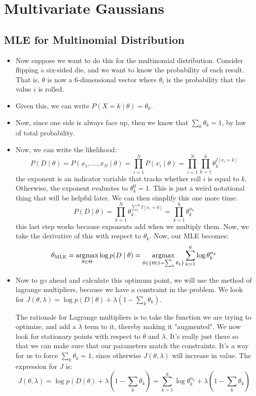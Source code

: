\section{Multivariate Gaussians}
\subsection{MLE for Multinomial Distribution}
\begin{itemize}
	\item Now suppose we want to do this for the multinomial distribution. Consider
		flipping a six-sided die, and we want to know the probability of each result.
		That is, \( \theta \) is now a 6-dimensional vector where \( \theta_i \) is
		the probability that the value \( i \) is rolled. 
	\item Given this, we can write \( P(X = k \mid \theta) = \theta_k \). 
	\item Now, since one side is always face up, then we know that \( \sum_k \theta_k
		= 1\), by law of total probability.  
	\item Now, we can write the likelihood:
		\[
			P(D \mid \theta) = P(x_1, \dots, x_N \mid \theta) = \prod_{i = 1}^{N}
			P(x_i \mid \theta) = \prod_{i = 1}^{N}\prod_{k = 1}^{6} \theta_k^{I[x_i =
			k]}
		\]
		the exponent is an indicator variable that tracks whether roll \( i \) is
		equal to \( k \). Otherwise, the exponent evaluates to \( \theta_k^{0} = 1
		\). This is just a weird notational thing that will be helpful later. We can
		then simplify this one more time:
		\[
			P(D \mid \theta) = \prod_{k = 1}^{N}\theta_k^{\sum_{i}^{N} I[x_i = k]} =
			\prod_{k = 1}^{6}\theta_k^{n_k}
		\]
		this last step works because exponents add when we multiply them. Now, we
		take the derivative of this with respect to \( \theta_k \). Now, our MLE
		becomes:
		\[
			\theta_\text{MLE} = \operatorname*{argmax}_{\theta \in \Theta} \log p(D \mid \theta) =
			\operatorname*{argmax}_{\theta \in \{\Theta \mid 1 = \sum_k \theta_k\}}\sum_{k =
			1}^{6}\log \theta_k^{n_k}
		\]
	\item Now to go ahead and calculate this optimum point, we will use the method of
		lagrange multipliers, because we have a constraint in the problem. 
		We look for \( J(\theta, \lambda) = \log p(D \mid
		\theta) + \lambda(1 - \sum_k \theta_k) \). 

		The rationale for Lagrange multipliers is to take the function we are trying
		to optimize, and add a \( \lambda \) term to it, thereby making it
		"augmented". We now look for stationary points with respect to \( \theta \)
		and \( \lambda \).  
		It's really just there so that we can make sure that our parameters match the
		constraints. It's a way for us to force \( \sum_k \theta_k = 1 \), since
		otherwise \( J(\theta, \lambda) \) will increase in value. The expression for
		\( J \) is:
		\[
			J(\theta, \lambda) = \log p(D \mid \theta) + \lambda \left( 1 - \sum_k
			\theta_k \right) = \sum_{k = 1}^{6}\log \theta_k^{n_k} + \lambda \left( 1
			- \sum_k \theta_k \right)
		\]


\end{itemize}
